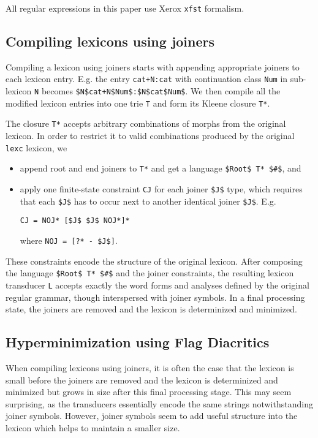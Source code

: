\documentclass[11pt]{article}
\begin{document}
All regular expressions in this paper use Xerox {\tt xfst} formalism.

\subsection{Compiling lexicons using joiners}

Compiling a lexicon using joiners starts with appending appropriate joiners to each lexicon entry. E.g. the entry {\tt cat+N:cat} with continuation class {\tt Num} in sub-lexicon {\tt N} becomes {\tt \$N\$cat+N\$Num\$:\$N\$cat\$Num\$}. We then compile all the modified lexicon entries into one trie {\tt T} and form its Kleene closure {\tt T*}. 

The closure {\tt T*} accepts arbitrary combinations of morphs from the original lexicon. In order to restrict it to valid combinations produced by the original {\tt lexc} lexicon, we 

\begin{itemize}
\item append root and end joiners to {\tt T*} and get a language {\tt \$Root\$ T* \$\#\$}, and
\item apply one finite-state constraint {\tt CJ} for each joiner {\tt \$J\$} type, which requires that each {\tt \$J\$} has to occur next to another identical joiner {\tt \$J\$}. E.g.
\begin{verbatim}
CJ = NOJ* [$J$ $J$ NOJ*]*
\end{verbatim}
where {\tt NOJ = [?* - \$J\$]}.

\end{itemize}

These constraints encode the structure of the original lexicon. After
composing the language {\tt \$Root\$ T* \$\#\$} and the joiner
constraints, the resulting lexicon transducer {\tt L} accepts exactly
the word forms and analyses defined by the original regular grammar,
though interspersed with joiner symbols. In a final processing state,
the joiners are removed and the lexicon is determinized and minimized.

\subsection{Hyperminimization using Flag Diacritics}

When compiling lexicons using joiners, it is often the case that the
lexicon is small before the joiners are removed and the lexicon is
determinized and minimized but grows in size after this final
processing stage. This may seem surprising, as the transducers
essentially encode the same strings notwithstanding joiner
symbols. However, joiner symbols seem to add useful structure into
the lexicon which helps to maintain a smaller size.
\end{document}
